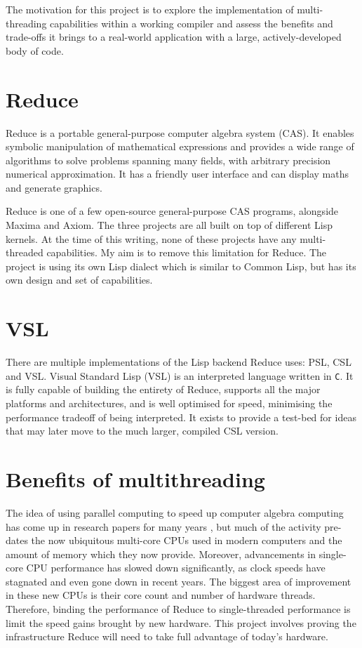 The motivation for this project is to explore the implementation of multi-threading
capabilities within a working compiler and assess the benefits and trade-offs it brings
to a real-world application with a large, actively-developed body of code.

\section{Reduce}

Reduce \cite{reduce} is a portable general-purpose computer algebra system (CAS). It enables symbolic
manipulation of mathematical expressions and provides a wide range of algorithms
to solve problems spanning many fields, with arbitrary precision numerical approximation.
It has a friendly user interface and can display maths and generate graphics.

Reduce is one of a few open-source general-purpose CAS programs, alongside Maxima and Axiom.
The three projects are all built on top of different Lisp kernels. At the time of this writing,
none of these projects have any multi-threaded capabilities. My aim is to remove this limitation
for Reduce. The project is using its own Lisp dialect which is similar to Common Lisp, but has its
own design and set of capabilities.

\section{VSL}

There are multiple implementations of the Lisp backend Reduce uses: PSL, CSL and VSL.
Visual Standard Lisp (VSL) is an interpreted language written
in \texttt{C}. It is fully capable of building the entirety of Reduce, supports all the major
platforms and architectures, and is well optimised for speed, minimising the performance tradeoff
of being interpreted. It exists to provide a test-bed for ideas that may later move to the much larger,
compiled CSL version.

\section{Benefits of multithreading}
The idea of using parallel computing to speed up computer algebra computing has come
up in research papers for many years \cite{GabrielQML,multilisp,multilisp-implementation},
but much of the activity
pre-dates the now ubiquitous multi-core CPUs used in modern computers and the amount of memory
which they now provide. Moreover, advancements in single-core CPU performance has slowed down
significantly, as clock speeds have stagnated and even gone down in recent years. The biggest
area of improvement in these new CPUs is their core count and number of hardware threads.
Therefore, binding the performance of Reduce to single-threaded performance is limit the speed gains
brought by new hardware. This project involves proving the infrastructure
Reduce will need to take full advantage of today's hardware.

